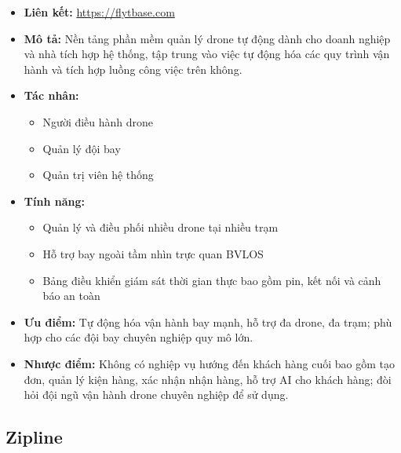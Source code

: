 \begin{itemize}
  \item \textbf{Liên kết:} \url{https://flytbase.com}
  \item \textbf{Mô tả:} Nền tảng phần mềm quản lý drone tự động dành cho doanh nghiệp và nhà tích hợp hệ thống, tập trung vào việc tự động hóa các quy trình vận hành và tích hợp luồng công việc trên không.
  \item \textbf{Tác nhân:}
    \begin{itemize}
      \item Người điều hành drone
      \item Quản lý đội bay
      \item Quản trị viên hệ thống
    \end{itemize}
  \item \textbf{Tính năng:}
    \begin{itemize}
      \item Quản lý và điều phối nhiều drone tại nhiều trạm
      \item Hỗ trợ bay ngoài tầm nhìn trực quan BVLOS
      \item Bảng điều khiển giám sát thời gian thực bao gồm pin, kết nối và cảnh báo an toàn
    \end{itemize}
  \item \textbf{Ưu điểm:} Tự động hóa vận hành bay mạnh, hỗ trợ đa drone, đa trạm; phù hợp cho các đội bay chuyên nghiệp quy mô lớn.
  \item \textbf{Nhược điểm:} Không có nghiệp vụ hướng đến khách hàng cuối bao gồm tạo đơn, quản lý kiện hàng, xác nhận nhận hàng, hỗ trợ AI cho khách hàng; đòi hỏi đội ngũ vận hành drone chuyên nghiệp để sử dụng.
\end{itemize}

\subsection{Zipline}

